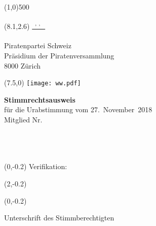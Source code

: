\documentclass[11pt, a4paper]{scrartcl}
\newcommand{\votingdate}{27.~November~2018}
\begin{document}
{\begin{minipage}[t][13.42cm][t]{\textwidth}
\end{minipage}

\line(1,0){500}
\vspace{1cm}

\begin{minipage}[t][12.5cm][t]{\textwidth}

\begin{textblock}{9}(8.1,2.6)
\underline{\textsuperscript*{ \givenname~\surname, \street, \postalcode~\location }} \\
\vspace{-0.3cm} \\
Piratenpartei Schweiz \\
Präsidium der Piratenversammlung \\
8000 Zürich
\end{textblock}

\begin{textblock}{6}(7.5,0)
\texttt{[image: ww.pdf]}
\end{textblock}

{\LARGE\textbf{Stimmrechtsausweis}} \\
für die Urabstimmung vom \votingdate{} \\

Mitglied Nr. \textbf{\id}   \\
\givenname~\surname         \\
\street                     \\
\postalcode~\location       \\
%

\begin{textblock}{6}(0,-0.2)
Verifikation:
\end{textblock}

\begin{textblock}{4}(2,-0.2)
\raggedright
\code
\end{textblock}

\vspace{4cm}

\begin{textblock}{6}(0,-0.2)
\begin{framed}
Unterschrift des Stimmberechtigten \\
\vspace{1.5cm} ~ \\
\end{framed}
\end{textblock}


\end{minipage}}
\end{document}
